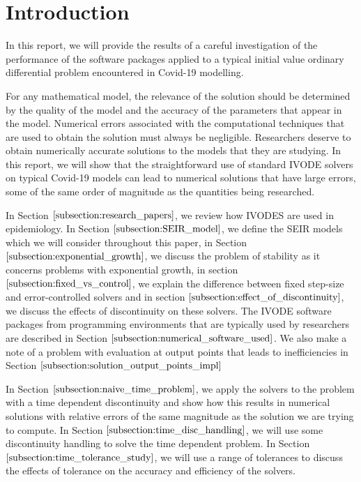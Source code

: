 
\section{Introduction}
\label{section:intro}
In this report, we will provide the results of a careful investigation of the performance of the software packages applied to a typical initial value ordinary differential problem encountered in Covid-19 modelling. 

For any mathematical model, the relevance of the solution should be determined by the quality of the model and the accuracy of the parameters that appear in the model. Numerical errors associated with the computational techniques that are used to obtain the solution must always be negligible. Researchers deserve to obtain numerically accurate solutions to the models that they are studying. In this report, we will show that the straightforward use of standard IVODE solvers on typical Covid-19 models can lead to numerical solutions that have large errors, some of the same order of magnitude as the quantities being researched.

In Section $\ref{subsection:research_papers}$, we review how IVODES are used in epidemiology. In Section $\ref{subsection:SEIR_model}$, we define the SEIR models which we will consider throughout this paper, in Section $\ref{subsection:exponential_growth}$, we discuss the problem of stability as it concerns problems with exponential growth, in section $\ref{subsection:fixed_vs_control}$, we explain the difference between fixed step-size and error-controlled solvers and in section $\ref{subsection:effect_of_discontinuity}$, we discuss the effects of discontinuity on these solvers. The IVODE software packages from programming environments that are typically used by researchers are described in Section $\ref{subsection:numerical_software_used}$. We also make a note of a problem with evaluation at output points that leads to inefficiencies in Section $\ref{subsection:solution_output_points_impl}$

In Section $\ref{subsection:naive_time_problem}$, we apply the solvers to the problem with a time dependent discontinuity and show how this results in numerical solutions with relative errors of the same magnitude as the solution we are trying to compute. In Section $\ref{subsection:time_disc_handling}$, we will use some discontinuity handling to solve the time dependent problem. In Section $\ref{subsection:time_tolerance_study}$, we will use a range of tolerances to discuss the effects of tolerance on the accuracy and efficiency of the solvers.

